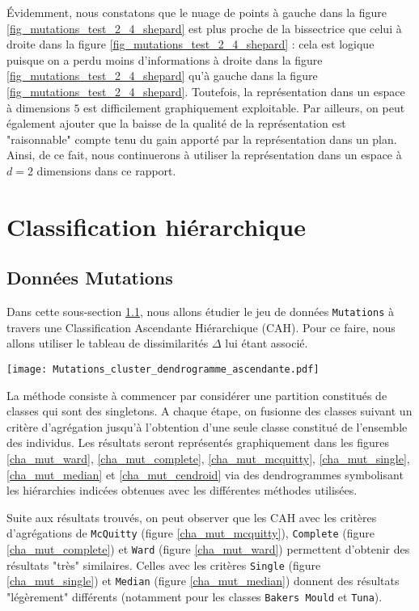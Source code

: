 \documentclass{article}
\begin{document}
\begin{multicols}{2}
Évidemment, nous constatons que le nuage de points à gauche dans la figure \ref{fig_mutations_test_2_4_shepard} est plus proche de la bissectrice que celui à droite dans la figure \ref{fig_mutations_test_2_4_shepard} : cela est logique puisque on a perdu moins d'informations à droite dans la figure \ref{fig_mutations_test_2_4_shepard} qu'à gauche dans la figure \ref{fig_mutations_test_2_4_shepard}. Toutefois, la représentation dans un espace à dimensions $5$ est difficilement graphiquement exploitable. Par ailleurs, on peut également ajouter que la baisse de la qualité de la représentation est "raisonnable" compte tenu du gain apporté par la représentation dans un plan. Ainsi, de ce fait, nous continuerons à utiliser la représentation dans un espace à $d = 2$ dimensions dans ce rapport. 

\section{Classification hiérarchique}
\label{sec_classification_hierarchique}

\subsection{Données Mutations}
\label{subsec_class_hier_mutations}

Dans cette sous-section \ref{subsec_class_hier_mutations}, nous allons étudier le jeu de données \texttt{Mutations} à travers une Classification Ascendante Hiérarchique (CAH). Pour ce faire, nous allons utiliser le tableau de dissimilarités $\Delta$ lui étant associé. 

\begingroup
   \centering
   \texttt{[image: Mutations\_cluster\_dendrogramme\_ascendante.pdf]}
    \label{cha_mut_ward}
\endgroup

La méthode consiste à commencer par considérer une partition constitués de classes qui sont des singletons. A chaque étape, on fusionne des classes suivant un critère d'agrégation jusqu'à l'obtention d'une seule classe constitué de l'ensemble des individus. Les résultats seront représentés graphiquement dans les figures \ref{cha_mut_ward}, \ref{cha_mut_complete}, \ref{cha_mut_mcquitty}, \ref{cha_mut_single}, \ref{cha_mut_median} et \ref{cha_mut_cendroid} via des dendrogrammes symbolisant les hiérarchies indicées obtenues avec les différentes méthodes utilisées.

Suite aux résultats trouvés, on peut observer que les CAH avec les critères d'agrégations de \texttt{McQuitty} (figure \ref{cha_mut_mcquitty}), \texttt{Complete} (figure \ref{cha_mut_complete}) et \texttt{Ward} (figure \ref{cha_mut_ward}) permettent d'obtenir des résultats "très" similaires. Celles avec les critères \texttt{Single} (figure \ref{cha_mut_single}) et \texttt{Median} (figure \ref{cha_mut_median}) donnent des résultats "légèrement" différents (notamment pour les classes \texttt{Bakers Mould} et \texttt{Tuna}). 


\end{multicols}
\end{document}
